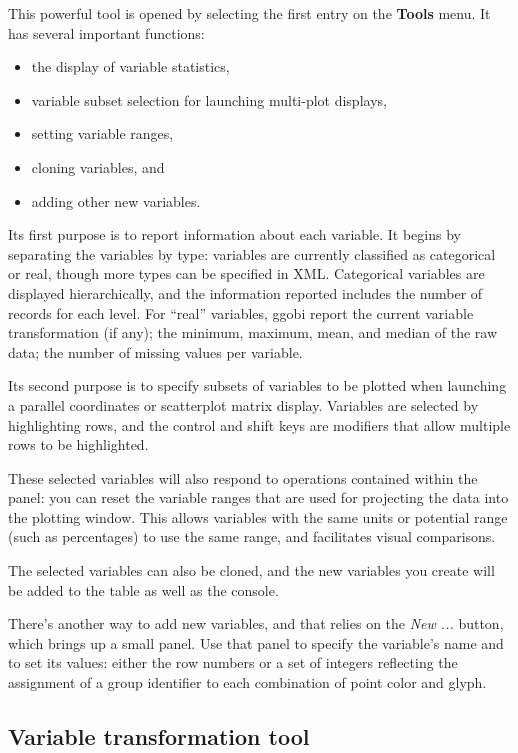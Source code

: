 \documentclass[11pt]{article}
\begin{document}
This powerful tool is opened by selecting the first entry on the
{\bf Tools} menu.  It has several important functions:
\begin{itemize} \itemsep 0em
\item the display of variable statistics,
\item variable subset selection for launching multi-plot displays,
\item setting variable ranges,
\item cloning variables, and
\item adding other new variables.
\end{itemize}

Its first purpose is to report information about each variable.
It begins by separating the variables by type: variables are
currently classified as categorical or real, though more types
can be specified in XML.  Categorical variables are displayed
hierarchically, and the information reported includes the number
of records for each level.  For ``real'' variables, ggobi report
the current variable transformation (if any); the minimum,
maximum, mean, and median of the raw data; the number of missing values
per variable.

Its second purpose is to specify subsets of variables to be plotted
when launching a parallel coordinates or scatterplot matrix display.
Variables are selected by highlighting rows, and the control and shift
keys are modifiers that allow multiple rows to be highlighted.

These selected variables will also respond to operations contained
within the panel:  you can reset the variable ranges that are used
for projecting the data into the plotting window.  This allows
variables with the same units or potential range (such as percentages)
to use the same range, and facilitates visual comparisons.

The selected variables can also be cloned, and the new variables
you create will be added to the table as well as the console.

\label{NewVariable}
There's another way to add new variables, and that relies on the {\em New
...} button, which brings up a small panel.  Use that panel to specify
the variable's name and to set its values:  either the row numbers or
a set of integers reflecting the assignment of a group identifier to each
combination of point color and glyph.

\subsection{Variable transformation tool}
\label{slbl:VarTransform}
\end{document}
